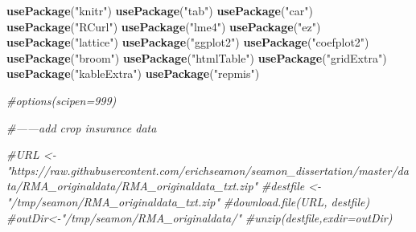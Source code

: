\documentclass[]{article}
\newenvironment{Shaded}{\begin{snugshade}}{\end{snugshade}}
\newcommand{\CommentTok}[1]{\textcolor[rgb]{0.56,0.35,0.01}{\textit{#1}}}
\newcommand{\KeywordTok}[1]{\textcolor[rgb]{0.13,0.29,0.53}{\textbf{#1}}}
\newcommand{\NormalTok}[1]{#1}
\newcommand{\StringTok}[1]{\textcolor[rgb]{0.31,0.60,0.02}{#1}}
\begin{document}
\begin{Shaded}
\begin{Highlighting}[]
\KeywordTok{usePackage}\NormalTok{(}\StringTok{"knitr"}\NormalTok{)}
\KeywordTok{usePackage}\NormalTok{(}\StringTok{"tab"}\NormalTok{)}
\KeywordTok{usePackage}\NormalTok{(}\StringTok{"car"}\NormalTok{)}
\KeywordTok{usePackage}\NormalTok{(}\StringTok{"RCurl"}\NormalTok{)}
\KeywordTok{usePackage}\NormalTok{(}\StringTok{"lme4"}\NormalTok{)}
\KeywordTok{usePackage}\NormalTok{(}\StringTok{"ez"}\NormalTok{)}
\KeywordTok{usePackage}\NormalTok{(}\StringTok{"lattice"}\NormalTok{)}
\KeywordTok{usePackage}\NormalTok{(}\StringTok{"ggplot2"}\NormalTok{)}
\KeywordTok{usePackage}\NormalTok{(}\StringTok{"coefplot2"}\NormalTok{)}
\KeywordTok{usePackage}\NormalTok{(}\StringTok{"broom"}\NormalTok{)}
\KeywordTok{usePackage}\NormalTok{(}\StringTok{"htmlTable"}\NormalTok{)}
\KeywordTok{usePackage}\NormalTok{(}\StringTok{"gridExtra"}\NormalTok{)}
\KeywordTok{usePackage}\NormalTok{(}\StringTok{"kableExtra"}\NormalTok{)}
\KeywordTok{usePackage}\NormalTok{(}\StringTok{"repmis"}\NormalTok{)}



\CommentTok{#options(scipen=999)}


\CommentTok{#------add crop insurance data}

\CommentTok{#URL <- "https://raw.githubusercontent.com/erichseamon/seamon_dissertation/master/data/RMA_originaldata/RMA_originaldata_txt.zip"}
\CommentTok{#destfile <- "/tmp/seamon/RMA_originaldata_txt.zip"}
\CommentTok{#download.file(URL, destfile)}
\CommentTok{#outDir<-"/tmp/seamon/RMA_originaldata/"}
\CommentTok{#unzip(destfile,exdir=outDir)}



\end{Highlighting}
\end{Shaded}
\end{document}
